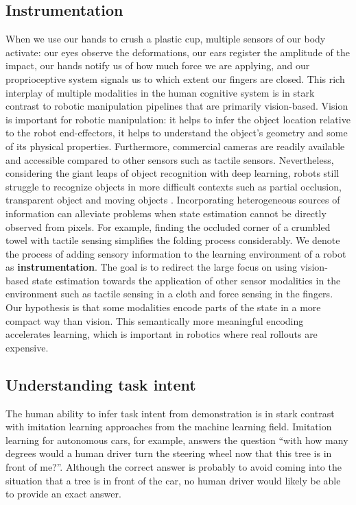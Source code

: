 \documentclass[\home/main.tex]{subfiles}
\begin{document}
\subsection{Instrumentation}
When we use our hands to crush a plastic cup, multiple sensors of our body activate: our eyes observe the deformations, our ears register the amplitude of the impact, our hands notify us of how much force we are applying, and our proprioceptive system signals us to which extent our fingers are closed. This rich interplay of multiple modalities in the human cognitive system is in stark contrast to robotic manipulation pipelines that are primarily vision-based. Vision is important for robotic manipulation: it helps to infer the object location relative to the robot end-effectors, it helps to understand the object's geometry and some of its physical properties. Furthermore, commercial cameras are readily available and accessible compared to other sensors such as tactile sensors. Nevertheless, considering the giant leaps of object recognition with deep learning, robots still struggle to recognize objects in more difficult contexts such as partial occlusion, transparent object and moving objects \autocite{Guo2014,sajjan2019cleargrasp,Ojha2015}.
Incorporating heterogeneous sources of information can alleviate problems when state estimation cannot be directly observed from pixels. For example, finding the occluded corner of a crumbled towel with tactile sensing simplifies the folding process considerably.
We denote the process of adding sensory information to the learning environment of a robot as \textbf{instrumentation}. The goal is to redirect the large focus on using vision-based state estimation towards the application of other sensor modalities in the environment such as tactile sensing in a cloth and force sensing in the fingers. Our hypothesis is that some modalities encode parts of the state in a more compact way than vision. This semantically more meaningful encoding accelerates learning, which is important in robotics where real rollouts are expensive.

\subsection{Understanding task intent}
The human ability to infer task intent from demonstration is in stark contrast with imitation learning approaches from the machine learning field. Imitation learning for autonomous cars, for example, answers the question \enquote{with how many degrees would a human driver turn the steering wheel now that this tree is in front of me?}.
Although the correct answer is probably to avoid coming into the situation that a tree is in front of the car, no human driver would likely be able to provide an exact answer.
\end{document}
